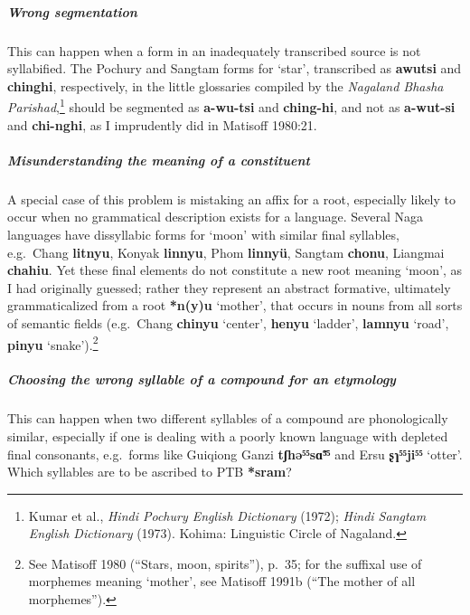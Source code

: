 \subparagraph{Wrong segmentation}
This can happen when a form in an inadequately transcribed source is not
syllabified. The Pochury and Sangtam forms for ‘star’, transcribed as \textbf{awutsi}
and \textbf{chinghi}, respectively, in the little glossaries compiled by the
\textit{Nagaland
Bhasha Parishad},\footnote{Kumar et al., \textit{Hindi Pochury English Dictionary} (1972);
\textit{Hindi
Sangtam English Dictionary} (1973). Kohima: Linguistic Circle of Nagaland.}
 should
be segmented as \textbf{a-wu-tsi} and \textbf{ching-hi},
and not as \textbf{a-wut-si} and \textbf{chi-nghi}, as I
imprudently did in Matisoff 1980:21.


\subparagraph{Misunderstanding the meaning of a constituent}
A special case of this problem is mistaking an affix for a root, especially
likely to occur when no grammatical description exists for a language. Several
Naga languages have dissyllabic forms for ‘moon’ with similar final syllables,
e.g.\ Chang \textbf{litnyu}, Konyak \textbf{linnyu},
Phom \textbf{linnyü}, Sangtam \textbf{chonu}, Liangmai \textbf{chahiu}.
Yet these final elements do not constitute a new root meaning ‘moon’, as I had
originally guessed; rather they represent an abstract formative, ultimately
grammaticalized from a root \textbf{*n(y)u} ‘mother’, that occurs in nouns from all sorts
of semantic fields (e.g.\ Chang \textbf{chinyu} ‘center’,
\textbf{henyu} ‘ladder’, \textbf{lamnyu} ‘road’,
\textbf{pinyu} ‘snake’).\footnote{See Matisoff 1980 (“Stars, moon, spirits”), p.\ 35;
for the
suffixal use of morphemes meaning ‘mother’, see Matisoff 1991b (“The mother of all
morphemes”).}


\subparagraph{Choosing the wrong syllable of a compound for an etymology}
This can happen when two different syllables of a compound are phonologically
similar, especially if one is dealing with a poorly known language with depleted
final consonants, e.g.\ forms like Guiqiong Ganzi \textbf{tʃhə⁵⁵sɑ̃⁵⁵}
and Ersu \textbf{ʂɿ⁵⁵ji⁵⁵} ‘otter’.
Which syllables are to be ascribed to PTB \textbf{*sram}? 


